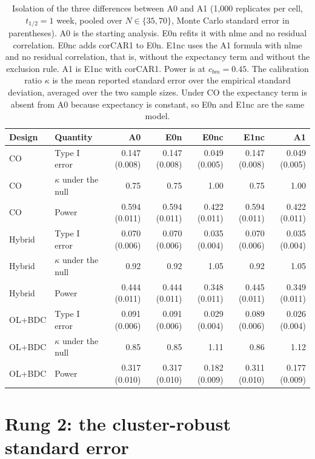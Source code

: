 \documentclass[
  11pt,
]{article}
\begin{document}
\begin{table}
\centering
\caption{\label{tab:iso-table}Isolation of the three differences between A0 and A1
    (1,000 replicates per cell, $t_{1/2} = 1$ week,
    pooled over $N \in \{35, 70\}$, Monte Carlo standard error in
    parentheses). A0 is the starting analysis. E0n refits it with
    nlme and no residual correlation. E0nc adds corCAR1 to E0n. E1nc
    uses the A1 formula with nlme and no residual correlation, that
    is, without the expectancy term and without the exclusion rule.
    A1 is E1nc with corCAR1. Power is at $c_{bm} = 0.45$. The
    calibration ratio $\kappa$ is the mean reported standard error over
    the empirical standard deviation, averaged over the two sample
    sizes. Under CO the expectancy term is absent from A0 because
    expectancy is constant, so E0n and E1nc are the same model.}
\centering
\fontsize{9}{11}\selectfont
\begin{tabular}[t]{llrrrrr}
\toprule
Design & Quantity & A0 & E0n & E0nc & E1nc & A1\\
\midrule
CO & Type I error & 0.147 (0.008) & 0.147 (0.008) & 0.049 (0.005) & 0.147 (0.008) & 0.049 (0.005)\\
CO & $\kappa$ under the null & 0.75 & 0.75 & 1.00 & 0.75 & 1.00\\
CO & Power & 0.594 (0.011) & 0.594 (0.011) & 0.422 (0.011) & 0.594 (0.011) & 0.422 (0.011)\\
Hybrid & Type I error & 0.070 (0.006) & 0.070 (0.006) & 0.035 (0.004) & 0.070 (0.006) & 0.035 (0.004)\\
Hybrid & $\kappa$ under the null & 0.92 & 0.92 & 1.05 & 0.92 & 1.05\\
Hybrid & Power & 0.444 (0.011) & 0.444 (0.011) & 0.348 (0.011) & 0.445 (0.011) & 0.349 (0.011)\\
OL+BDC & Type I error & 0.091 (0.006) & 0.091 (0.006) & 0.029 (0.004) & 0.089 (0.006) & 0.026 (0.004)\\
OL+BDC & $\kappa$ under the null & 0.85 & 0.85 & 1.11 & 0.86 & 1.12\\
OL+BDC & Power & 0.317 (0.010) & 0.317 (0.010) & 0.182 (0.009) & 0.311 (0.010) & 0.177 (0.009)\\
\bottomrule
\end{tabular}
\end{table}

\section{Rung 2: the cluster-robust standard error}\label{rung-2-the-cluster-robust-standard-error}
\end{document}
